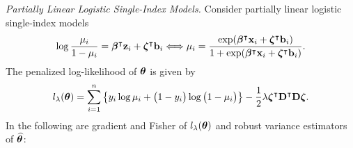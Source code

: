 \emph{Partially Linear Logistic Single-Index Models.}
Consider partially linear logistic single-index models
\begin{equation}
	\log \frac{\mu_i}{1-\mu_i} = \bm\beta^\intercal\mathbf{z}_i+\bm\zeta^\intercal\mathbf{b}_i\Longleftrightarrow \mu_i = \frac{\exp(\bm\beta^\intercal\mathbf{x}_i+\bm\zeta^\intercal\mathbf{b}_i)}{1+\exp(\bm\beta^\intercal\mathbf{x}_i+\bm\zeta^\intercal\mathbf{b}_i)}. \label{logistic}
\end{equation}
The penalized log-likelihood of $\bm\theta$ is given by
\begin{equation*}
	l_\lambda(\bm\theta) = \sum_{i=1}^n \left\{y_i\log\mu_i+\big(1-y_i\big)\log\big(1-\mu_i\big)\right\} - \frac{1}{2}\lambda\bm\zeta^\intercal\mathbf{D}^\intercal\mathbf{D}\bm\zeta.
\end{equation*}	
In the following are gradient and Fisher of $l_\lambda(\bm\theta)$ and robust variance estimators of $\widehat{\bm\theta}$:
\vspace{-0.35cm}
